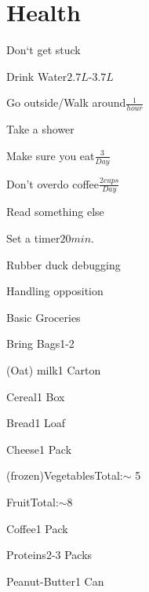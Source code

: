 
\section{Health}
\begin{checklist}{Don`t get stuck}
  \item{Drink Water}{$2.7L$-$3.7L$\cite{appel2005dietary}} 
  \item{Go outside/Walk around}{$\frac{1}{hour}$}
  \item{Take a shower}{}
  \item{Make sure you eat}{$\frac{3}{Day}$}
  \item{Don't overdo coffee}{$\frac{2 cups}{Day}$}
  \item{Read something else}{\cite{compiling}}
  \item{Set a timer}{$20 min.$}
  \item{Rubber duck debugging}{\cite{RUBBERDUCKING}}%
\end{checklist}

\begin{checklist}{Handling opposition \cite{EDWARDRENKEL}}%
\end{checklist}

\begin{checklist}{Basic Groceries}
    \item{Bring Bags}{1-2}
    \item{(Oat) milk}{1 Carton} 
    \item{Cereal}{1 Box}
    \item{Bread}{1 Loaf}
    \item{Cheese}{1 Pack}
    \item{(frozen)Vegetables}{Total:$\sim$ 5}
    \item{Fruit}{Total:$\sim$8}
    \item{Coffee}{1 Pack}
    \item{Proteins}{2-3 Packs}
    \item{Peanut-Butter}{1 Can}
        
\end{checklist}
